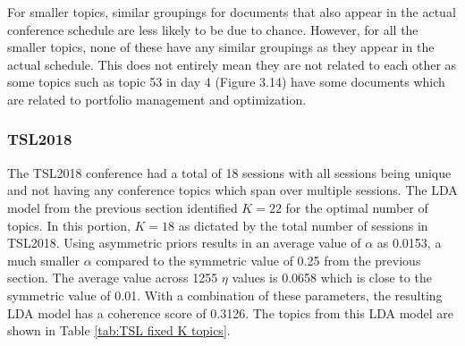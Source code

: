 \documentclass[a4paper, 12pt, twoside]{article}
\numberwithin{equation}{section} %
\begin{document}
For smaller topics, similar groupings for documents that also appear in the actual conference schedule are less likely to be due to chance. However, for all the smaller topics, none of these have any similar groupings as they appear in the actual schedule. This does not entirely mean they are not related to each other as some topics such as topic 53 in day 4 (Figure 3.14) have some documents which are related to portfolio management and optimization. 

\subsubsection{TSL2018}

The TSL2018 conference had a total of 18 sessions with all sessions being unique and not having any conference topics which span over multiple sessions. The LDA model from the previous section identified $K = 22$ for the optimal number of topics. In this portion, $K = 18$ as dictated by the total number of sessions in TSL2018. Using asymmetric priors results in an average value of $\alpha$ as 0.0153, a much smaller $\alpha$ compared to the symmetric value of 0.25 from the previous section. The average value across 1255 $\eta$ values is 0.0658 which is close to the symmetric value of 0.01. With a combination of these parameters, the resulting LDA model has a coherence score of 0.3126. The topics from this LDA model are shown in Table \ref{tab:TSL fixed K topics}.
\end{document}
